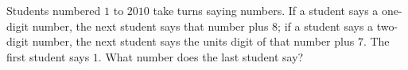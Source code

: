 Students numbered $1$ to $2010$ take turns saying numbers. If a student says a one-digit number, the next student says that number plus $8$; if a student says a two-digit number, the next student says the units digit of that number plus $7$. The first student says $1$. What number does the last student say?

